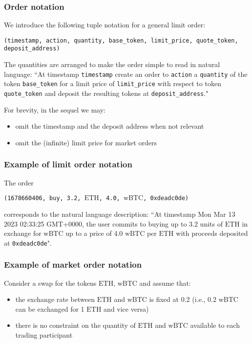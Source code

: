 \documentclass[11pt, reqno]{amsart}
\newcommand{\BTC}{\mathrm{wBTC}}
\newcommand{\ETH}{\mathrm{ETH}}
\begin{document}
\subsubsection{Order notation}
We introduce the following tuple notation for a general limit order:
\begin{center}
	\texttt{(timestamp, action, quantity, base\_token, limit\_price, quote\_token, 
     deposit\_address)}
\end{center}

The quantities are arranged to make the order simple to read in natural
language:
``At timestamp \texttt{timestamp} create an order to \texttt{action} a
\texttt{quantity} of the token \texttt{base\_token} for a limit price of
\texttt{limit\_price} with respect to token \texttt{quote\_token} and deposit
the resulting tokens at \texttt{deposit\_address}."

For brevity, in the sequel we may:
\begin{itemize}
	\item omit the timestamp and the deposit address when not relevant
	\item omit the (infinite) limit price for market orders
\end{itemize}

\subsubsection{Example of limit order notation}
The order
\begin{center}
	\texttt{(1678660406, buy, 3.2, $\ETH$, 4.0, $\BTC$, \texttt{0xdeadc0de})}
\end{center}
corresponds to the natural language description:
``At timestamp Mon Mar 13 2023 02:33:25 GMT+0000, the user commits to buying up
to 3.2 units of $\ETH$ in exchange for $\BTC$ up to a price of 4.0 $\BTC$ per
$\ETH$ with proceeds deposited at \texttt{0xdeadc0de}".

\subsubsection{Example of market order notation}
Consider a swap for the tokens $\ETH$, $\BTC$ and assume that:
\begin{itemize}
\item the exchange rate between $\ETH$ and $\BTC$ is fixed at 0.2 (i.e.,
  0.2 $\BTC$ can be exchanged for 1 $\ETH$ and vice versa)
\item there is no constraint on the quantity of $\ETH$ and $\BTC$ available to
  each trading participant
\end{itemize}
\end{document}
